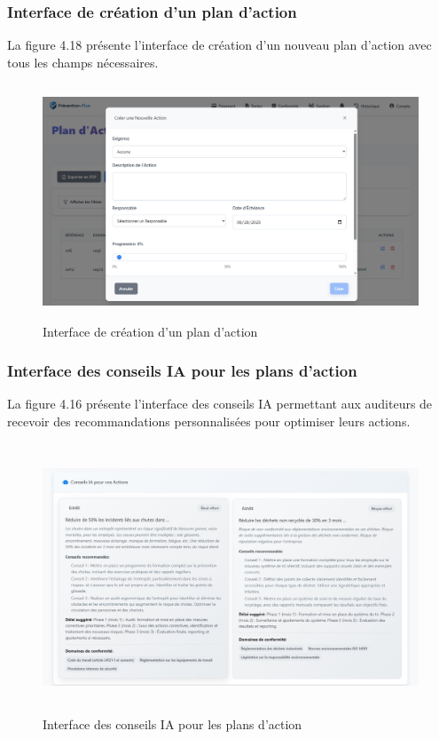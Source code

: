 \subsubsection{Interface de création d'un plan d'action}
\noindent La figure 4.18 présente l'interface de création d'un nouveau plan d'action avec tous les champs nécessaires.

\begin{figure}[H]
    \centering
    \includegraphics[width=13cm,height=7cm]{images/createactionmodal.PNG}
    \caption{Interface de création d'un plan d'action}
\end{figure}
\subsubsection{Interface des conseils IA pour les plans d'action}
La figure 4.16 présente l'interface des conseils IA permettant aux auditeurs de recevoir des recommandations personnalisées pour optimiser leurs actions.

\begin{figure}[H]
    \centering
    \includegraphics[width=13cm,height=8cm]{images/actionplanaiconseil.png
}
    \caption{Interface des conseils IA pour les plans d'action}
\end{figure}

